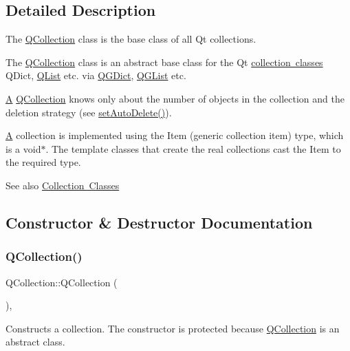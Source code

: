 \subsection{Detailed Description}
The \mbox{\hyperlink{class_q_collection}{Q\+Collection}} class is the base class of all Qt collections. 

The \mbox{\hyperlink{class_q_collection}{Q\+Collection}} class is an abstract base class for the Qt \mbox{\hyperlink{}{collection classes}} Q\+Dict, \mbox{\hyperlink{class_q_list}{Q\+List}} etc. via \mbox{\hyperlink{class_q_g_dict}{Q\+G\+Dict}}, \mbox{\hyperlink{class_q_g_list}{Q\+G\+List}} etc.

\mbox{\hyperlink{class_a}{A}} \mbox{\hyperlink{class_q_collection}{Q\+Collection}} knows only about the number of objects in the collection and the deletion strategy (see \mbox{\hyperlink{class_q_collection_a6ed41913c76bfba54be6da26015ee3f3}{set\+Auto\+Delete()}}).

\mbox{\hyperlink{class_a}{A}} collection is implemented using the {\ttfamily Item} (generic collection item) type, which is a {\ttfamily void$\ast$}. The template classes that create the real collections cast the {\ttfamily Item} to the required type.

\begin{DoxySeeAlso}{See also}
\mbox{\hyperlink{}{Collection Classes}} 
\end{DoxySeeAlso}


\subsection{Constructor \& Destructor Documentation}
\mbox{\label{class_q_collection_ab66048255d5340ef60bd8f4cc32d301d}} 
\subsubsection{\texorpdfstring{QCollection()}{QCollection()}\hspace{0.1cm}{\footnotesize\ttfamily [1/2]}}
{\footnotesize\ttfamily Q\+Collection\+::\+Q\+Collection (\begin{DoxyParamCaption}{ }\end{DoxyParamCaption})\hspace{0.3cm}{\ttfamily [inline]}, {\ttfamily [protected]}}

Constructs a collection. The constructor is protected because \mbox{\hyperlink{class_q_collection}{Q\+Collection}} is an abstract class. \mbox{\label{class_q_collection_a94f0f91325b3ac2ddad20c0e74dbd629}} 
